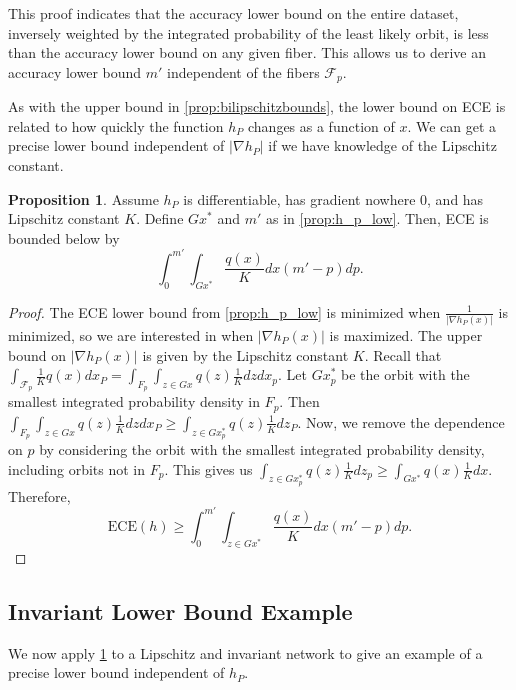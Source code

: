 \documentclass[10pt]{article} %
\theoremstyle{definition}
\newtheorem{proposition}{Proposition}
\begin{document}
This proof indicates that the accuracy lower bound on the entire dataset, inversely weighted by the integrated probability of the least likely orbit, is less than the accuracy lower bound on any given fiber. This allows us to derive an accuracy lower bound $m'$ independent of the fibers $\mathcal{F}_p$. 

As with the upper bound in \cref{prop:bilipschitzbounds}, the lower bound on ECE is related to how quickly the function $h_P$ changes as a function of $x$. We can get a precise lower bound independent of $| \nabla h_P |$ if we have knowledge of the Lipschitz constant. 

\begin{proposition} \label{prop:lowest}
Assume $h_P$ is differentiable, has gradient nowhere $0$, and has Lipschitz constant $K$. Define $Gx^*$ and $m'$ as in  \cref{prop:h_p_low}. Then, ECE is bounded below by 
\begin{equation*}
    \int_0^{m'} \int_{Gx^*} \frac{q(x)}{K} dx(m'-p)dp.
\end{equation*}
\end{proposition}

\begin{proof}
 The ECE lower bound from \cref{prop:h_p_low} is minimized when   $\frac{1}{|\nabla h_P(x)|}$ is minimized, so we are interested in when $|\nabla h_P(x)|$ is maximized. The upper bound on $|\nabla h_P(x)|$ is given by the Lipschitz constant $K$. Recall that $\int_{\mathcal{F}_p}\frac{1}{K}q(x)dx_P = \int_{F_p}\int_{z \in Gx}q(z)\frac{1}{K}dzdx_p$. Let $Gx_p^{*}$ be the orbit with the smallest integrated probability density in $F_p$. Then $\int_{F_p}\int_{z \in Gx}q(z)\frac{1}{K}dzdx_P \geq \int_{z \in Gx_p^{*}}q(z)\frac{1}{K}dz_P$. Now, we remove the dependence on $p$ by considering the orbit with the smallest integrated probability density, including orbits not in $F_p$. This gives us $\int_{z \in Gx_p^{*}}q(z)\frac{1}{K}dz_p \geq \int_{Gx^{*}}q(x)\frac{1}{K}dx$.  Therefore, 
%
 \begin{equation*}
  \text{ECE}(h) \geq    \int_0^{m'}\int_{z \in Gx^{*}}\frac{q(x)}{K}dx(m'-p)dp.
 \end{equation*}
%
\end{proof}


\subsection{Invariant Lower Bound Example}

We now apply \cref{prop:lowest} to a Lipschitz and invariant network to give an example of a precise lower bound independent of $h_P$.
\end{document}
